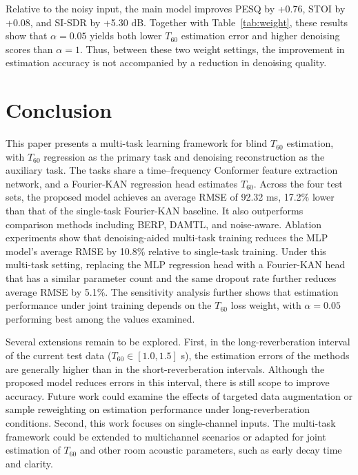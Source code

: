 \documentclass[a4paper,fleqn]{cas-sc}
\begin{document}
Relative to the noisy input, the main model improves PESQ by +0.76, STOI by +0.08, and SI-SDR by +5.30 dB. Together with Table~\ref{tab:weight}, these results show that $\alpha=0.05$ yields both lower $T_{60}$ estimation error and higher denoising scores than $\alpha=1$. Thus, between these two weight settings, the improvement in estimation accuracy is not accompanied by a reduction in denoising quality.



\section{Conclusion}
\label{sec:conclusion}



This paper presents a multi-task learning framework for blind $T_{60}$ estimation, with $T_{60}$ regression as the primary task and denoising reconstruction as the auxiliary task. The tasks share a time--frequency Conformer feature extraction network, and a Fourier-KAN regression head estimates $T_{60}$. Across the four test sets, the proposed model achieves an average RMSE of 92.32 ms, 17.2\% lower than that of the single-task Fourier-KAN baseline. It also outperforms comparison methods including BERP, DAMTL, and noise-aware. Ablation experiments show that denoising-aided multi-task training reduces the MLP model's average RMSE by 10.8\% relative to single-task training. Under this multi-task setting, replacing the MLP regression head with a Fourier-KAN head that has a similar parameter count and the same dropout rate further reduces average RMSE by 5.1\%. The sensitivity analysis further shows that estimation performance under joint training depends on the $T_{60}$ loss weight, with $\alpha=0.05$ performing best among the values examined.



Several extensions remain to be explored. First, in the long-reverberation interval of the current test data ($T_{60}\in[1.0,1.5]$ s), the estimation errors of the methods are generally higher than in the short-reverberation intervals. Although the proposed model reduces errors in this interval, there is still scope to improve accuracy. Future work could examine the effects of targeted data augmentation or sample reweighting on estimation performance under long-reverberation conditions. Second, this work focuses on single-channel inputs. The multi-task framework could be extended to multichannel scenarios or adapted for joint estimation of $T_{60}$ and other room acoustic parameters, such as early decay time and clarity.




\end{document}
